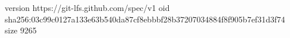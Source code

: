 version https://git-lfs.github.com/spec/v1
oid sha256:03c99c0127a133e63b540da87cf8ebbbf28b37207034884f8f905b7ef31d3f74
size 9265

